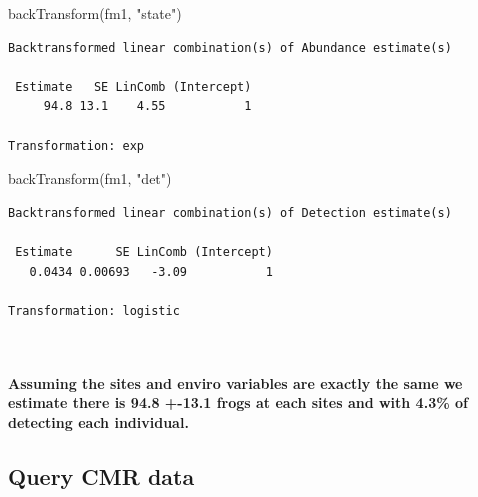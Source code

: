 \documentclass[
  letterpaper,
  DIV=11,
  numbers=noendperiod]{scrartcl}
\let\oldparagraph\paragraph
\renewcommand{\paragraph}[1]{\oldparagraph{#1}\mbox{}}
\newenvironment{Shaded}{\begin{snugshade}}{\end{snugshade}}
\newcommand{\FunctionTok}[1]{\textcolor[rgb]{0.28,0.35,0.67}{#1}}
\newcommand{\NormalTok}[1]{\textcolor[rgb]{0.00,0.23,0.31}{#1}}
\newcommand{\StringTok}[1]{\textcolor[rgb]{0.13,0.47,0.30}{#1}}
\begin{document}
\begin{Shaded}
\begin{Highlighting}[]
\FunctionTok{backTransform}\NormalTok{(fm1, }\StringTok{"state"}\NormalTok{) }
\end{Highlighting}
\end{Shaded}

\begin{verbatim}
Backtransformed linear combination(s) of Abundance estimate(s)

 Estimate   SE LinComb (Intercept)
     94.8 13.1    4.55           1

Transformation: exp 
\end{verbatim}

\begin{Shaded}
\begin{Highlighting}[]
\FunctionTok{backTransform}\NormalTok{(fm1, }\StringTok{"det"}\NormalTok{)}
\end{Highlighting}
\end{Shaded}

\begin{verbatim}
Backtransformed linear combination(s) of Detection estimate(s)

 Estimate      SE LinComb (Intercept)
   0.0434 0.00693   -3.09           1

Transformation: logistic 
\end{verbatim}

\(~\)

\hypertarget{assuming-the-sites-and-enviro-variables-are-exactly-the-same-we-estimate-there-is-94.8--13.1-frogs-at-each-sites-and-with-4.3-of-detecting-each-individual.}{%
\paragraph{Assuming the sites and enviro variables are exactly the same
we estimate there is 94.8 +-13.1 frogs at each sites and with 4.3\% of
detecting each
individual.}\label{assuming-the-sites-and-enviro-variables-are-exactly-the-same-we-estimate-there-is-94.8--13.1-frogs-at-each-sites-and-with-4.3-of-detecting-each-individual.}}

\newpage

\hypertarget{query-cmr-data}{%
\subsection{Query CMR data}\label{query-cmr-data}}
\end{document}
